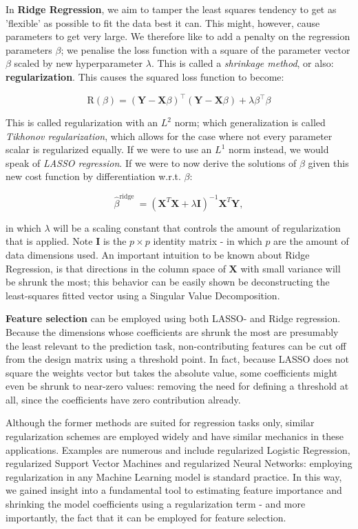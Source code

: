 \documentclass{article}
\begin{document}
In \textbf{Ridge Regression}, we aim to tamper the least squares tendency to get as 'flexible' as possible to fit the data best it can. This might, however, cause parameters to get very large. We therefore like to add a penalty on the regression parameters $\beta$; we penalise the loss function with a square of the parameter vector $\beta$ scaled by new hyperparameter $\lambda$. This is called a \textit{shrinkage method}, or also: \textbf{regularization}. This causes the squared loss function to become:

$$\text{R}(\beta) = (\mathbf{Y} - \mathbf{X} \beta)^\intercal (\mathbf{Y} - \mathbf{X} \beta)+\lambda \beta^\intercal \beta$$

This is called regularization with an $L^2$ norm; which generalization is called \textit{Tikhonov regularization}, which allows for the case where not every parameter scalar is regularized equally. If we were to use an $L^1$ norm instead, we would speak of \textit{LASSO regression}. If we were to now derive the solutions of $\beta$ given this new cost function by differentiation w.r.t. $\beta$:

$$\hat{\beta}^{\text {ridge }}=\left(\mathbf{X}^{T} \mathbf{X}+\lambda \mathbf{I}\right)^{-1} \mathbf{X}^{T} \mathbf{Y},$$

in which $\lambda$ will be a scaling constant that controls the amount of regularization that is applied. Note $\mathbf{I}$ is the $p \times p$ identity matrix - in which $p$ are the amount of data dimensions used. An important intuition to be known about Ridge Regression, is that directions in the column space of $\mathbf{X}$ with small variance will be shrunk the most; this behavior can be easily shown be deconstructing the least-squares fitted vector using a Singular Value Decomposition. 

\textbf{Feature selection} can be employed using both LASSO- and Ridge regression. Because the dimensions whose coefficients are shrunk the most are presumably the least relevant to the prediction task, non-contributing features can be cut off from the design matrix using a threshold point. In fact, because LASSO does not square the weights vector but takes the absolute value, some coefficients might even be shrunk to near-zero values: removing the need for defining a threshold at all, since the coefficients have zero contribution already.

Although the former methods are suited for regression tasks only, similar regularization schemes are employed widely and have similar mechanics in these applications. Examples are numerous and include regularized Logistic Regression, regularized Support Vector Machines and regularized Neural Networks: employing regularization in any Machine Learning model is standard practice. In this way, we gained insight into a fundamental tool to estimating feature importance and shrinking the model coefficients using a regularization term - and more importantly, the fact that it can be employed for feature selection.
\end{document}
